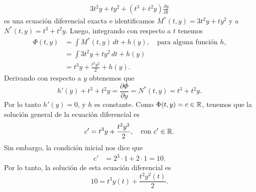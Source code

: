 \begin{solution}
\begin{align*}
        3t^2y+ty^2 
        +
        \left( 
            t^3 + t^2 y
        \right) \frac{\partial y}{\partial t}
    \end{align*}
    es una ecuación diferencial exacta e identificamos 
    \( M^*(t,y) = 3t^2 y + ty^2 \) y a \( N^* ( t, y ) = t^3 +t^2 y \).
    Luego, integrando con respecto a $t$ tenemos
    \begin{align*}
        \Phi(t,y)
        &=
        \int M^*(t,y) \, dt
        +
        h(y),\quad\text{para alguna función $h$,}\\
        &=
        \int
        3t^2y+ty^2\,dt
        +h(y)\\
        &=
        t^3 y + \frac{t^2 y^2}{2} + h(y).
    \end{align*}
    Derivando con respecto a $y$ obtenemos que 
    \[
        h'(y)
        +t^3 + t^2y = \frac{\partial \Phi}{\partial y} = N^*(t,y)=t^3+t^2 y.
    \]
    Por lo tanto $h'(y)=0$, y $h$ es constante. Como \( \Phi(t,y) = c\in\mathbb{R} \), tenemos que 
    la solución general de la ecuación diferencial es 
    \[
        c' = t^3 y + \frac{t^2 y^2}{2}, \quad\text{con $c'\in\mathbb{R}$}.
    \]
    Sin embargo, la condición inicial nos dice que 
    \begin{align*}
        c'
        &=
        2^3 \cdot 1
        +
        2 \cdot 1= 10.
    \end{align*}
    Por lo tanto, la solución de esta ecuación diferencial es 
    \[
        10 = t^3 y(t) +
        \frac{t^2 y^2(t)}{2}.
    \]
\end{solution}
